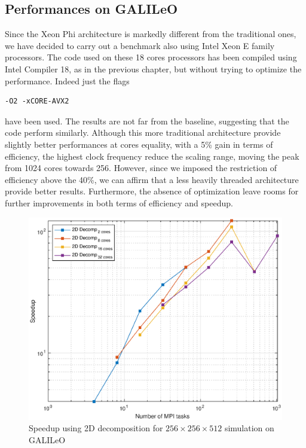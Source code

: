 \subsection{Performances on GALILeO}
Since the Xeon Phi architecture is markedly different from the traditional ones, we have decided to carry out a benchmark also using Intel Xeon E family processors. 
The code used on these 18 cores processors has been compiled using Intel Compiler 18, as in the previous chapter, but without trying to optimize the performance. 
Indeed just the flags 
\begin{lstlisting}
-O2 -xCORE-AVX2 
\end{lstlisting}
have been used.
The results are not far from the baseline, suggesting that the code perform similarly. Although this more traditional architecture provide slightly better performances at cores equality, with a 5\% gain in terms of efficiency, the highest clock frequency reduce the scaling range, moving the peak from 1024 cores towards 256. However, since we imposed the restriction of efficiency above the 40\%, we can affirm that a less heavily threaded architecture provide better results. Furthermore, the absence of optimization leave rooms for further improvements in both terms of efficiency and speedup.

\begin{figure}
\begin{center}
\includegraphics[scale=0.55]{grafici/galileo_speedup}
\caption{Speedup using 2D decomposition for $256\times 256\times 512$ simulation on GALILeO}
\label{galileo:speedup}
\end{center}
\end{figure}

